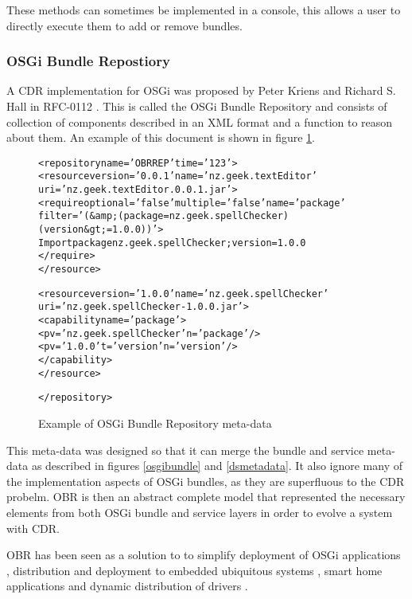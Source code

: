 These methods can sometimes be implemented in a console, this allows a user to directly execute them to add or remove bundles.

\subsubsection{OSGi Bundle Repostiory}
A CDR implementation for OSGi was proposed by Peter Kriens and Richard S. Hall in RFC-0112 \citep{the_osgi_alliance_rfc-0112_2006}.
This is called the OSGi Bundle Repository and consists of collection of components described in an XML format and a function to reason about them.
An example of this document is shown in figure \ref{obrmetadata}.

\begin{figure}[htp]
\begin{center}
\begin{alltt}
<repository name='OBR REP' time='123'> 
 <resource version='0.0.1' name='nz.geek.textEditor' 
 uri='nz.geek.textEditor.0.0.1.jar'> 
  <require optional='false'  multiple='false'  name='package' 
    filter='(&amp;(package=nz.geek.spellChecker)(version&gt;=1.0.0))'> 
   Import package nz.geek.spellChecker ;version=1.0.0 
  </require> 
 </resource> 

 <resource version='1.0.0' name='nz.geek.spellChecker' 
 uri='nz.geek.spellChecker-1.0.0.jar'> 
  <capability name='package'> 
    <p v='nz.geek.spellChecker' n='package'/> 
    <p v='1.0.0' t='version' n='version'/> 
  </capability> 
 </resource> 

</repository>
\end{alltt}
  \caption[OSGi Bundle Repository markup example]{Example of OSGi Bundle Repository meta-data}
  \label{obrmetadata}
\end{center}
\end{figure}

This meta-data was designed so that it can merge the bundle and service meta-data as described in figures \ref{osgibundle} and \ref{dsmetadata}.
It also ignore many of the implementation aspects of OSGi bundles, as they are superfluous to the CDR probelm.
OBR is then an abstract complete model that represented the necessary elements from both OSGi bundle and service layers in order to evolve a system with CDR. 

OBR has been seen as a solution to to simplify deployment of OSGi applications \citep{Jung2007}, 
distribution and deployment to embedded ubiquitous systems \citep{Jung2006}, 
smart home applications \citep{Gouin-Vallerand2007} and 
dynamic distribution of drivers \citep{Kriens2008}. 

